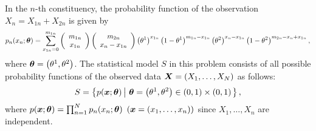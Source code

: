 \documentclass[graybox]{svmult}
\newcommand{\bm}[1]{\mbox{\boldmath $#1$}}
\begin{document}
\noindent
In the $n$-th constituency, the probability function of the observation $X_n=X_{1n}+X_{2n}$ is given by
%
\begin{eqnarray*}
   p_n(x_n;\bm{\theta}) = \sum_{x_{1n}=0}^{m_{1n}}\left(\begin{array}{c}
                                                           m_{1n} \\
                                                           x_{1n}
                                                        \end{array}
                                                  \right)
                                                  \left(\begin{array}{c}
                                                           m_{2n} \\
                                                           x_n - x_{1n}
                                                        \end{array}
                                                  \right)
                          \left(\theta^1\right)^{x_{1n}}\left(1 - \theta^1\right)^{m_{1n}-x_{1n}}
                          \left(\theta^2\right)^{x_n-x_{1n}}\left(1 - \theta^2\right)^{m_{2n}-x_n+x_{1n}},
\end{eqnarray*}
%
where $\bm{\theta}=\left(\theta^1,\theta^2\right)$.
The statistical model $S$ in this problem consists of all possible probability functions of the observed data
$\bm{X}=(X_1,\ldots,X_N)$ as follows:
%
\begin{eqnarray*}
   S = \left\{p(\bm{x};\bm{\theta}) \left| \ \bm{\theta}=\left(\theta^1,\theta^2\right) \in (0,1) \times (0,1)\right.\right\},
\end{eqnarray*}
%
where $p(\bm{x};\bm{\theta})=\prod_{n=1}^{N}p_n(x_n;\bm{\theta}) \ \left(\bm{x}=(x_1,\ldots,x_n)\right)$ since 
$X_1,\ldots,X_n$ are independent.
\end{document}
